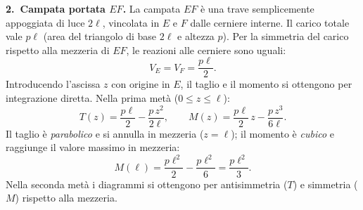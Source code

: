 \medskip
\noindent\textbf{2.~Campata portata $EF$.}
La campata $EF$ è una trave semplicemente appoggiata di luce $2\ell$,
vincolata in $E$ e $F$ dalle cerniere interne. Il carico totale vale
$p\ell$ (area del triangolo di base $2\ell$ e altezza $p$).
Per la simmetria del carico rispetto alla mezzeria di $EF$, le
reazioni alle cerniere sono uguali:
\[
V_E = V_F = \frac{p\ell}{2}.
\]
Introducendo l'ascissa $z$ con origine in $E$, il taglio e il
momento si ottengono per integrazione diretta. Nella prima metà
($0 \le z \le \ell$):
\[
T(z) = \frac{p\ell}{2} - \frac{p\,z^2}{2\ell},
\qquad
M(z) = \frac{p\ell}{2}\,z - \frac{p\,z^3}{6\ell}.
\]
Il taglio è \emph{parabolico} e si annulla in mezzeria ($z = \ell$);
il momento è \emph{cubico} e raggiunge il valore massimo in mezzeria:
\[
M\!\left(\ell\right) = \frac{p\ell^2}{2} - \frac{p\ell^2}{6}
= \frac{p\ell^2}{3}.
\]
Nella seconda metà i diagrammi si ottengono per antisimmetria ($T$)
e simmetria ($M$) rispetto alla mezzeria.
